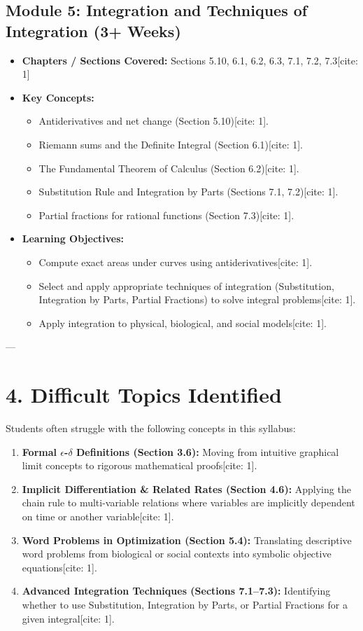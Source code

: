 \documentclass[11pt,a4paper]{article}
\begin{document}
\subsection*{Module 5: Integration and Techniques of Integration (3+ Weeks) \cite{1}}
\begin{itemize}
    \item \textbf{Chapters / Sections Covered:} Sections 5.10, 6.1, 6.2, 6.3, 7.1, 7.2, 7.3[cite: 1]
    \item \textbf{Key Concepts:}
    \begin{itemize}
        \item Antiderivatives and net change (Section 5.10)[cite: 1].
        \item Riemann sums and the Definite Integral (Section 6.1)[cite: 1].
        \item The Fundamental Theorem of Calculus (Section 6.2)[cite: 1].
        \item Substitution Rule and Integration by Parts (Sections 7.1, 7.2)[cite: 1].
        \item Partial fractions for rational functions (Section 7.3)[cite: 1].
    \end{itemize}
    \item \textbf{Learning Objectives:}
    \begin{itemize}
        \item Compute exact areas under curves using antiderivatives[cite: 1].
        \item Select and apply appropriate techniques of integration (Substitution, Integration by Parts, Partial Fractions) to solve integral problems[cite: 1].
        \item Apply integration to physical, biological, and social models[cite: 1].
    \end{itemize}
\end{itemize}

---

\section*{4. Difficult Topics Identified}
Students often struggle with the following concepts in this syllabus:
\begin{enumerate}
    \item \textbf{Formal $\epsilon$-$\delta$ Definitions (Section 3.6):} Moving from intuitive graphical limit concepts to rigorous mathematical proofs[cite: 1].
    \item \textbf{Implicit Differentiation \& Related Rates (Section 4.6):} Applying the chain rule to multi-variable relations where variables are implicitly dependent on time or another variable[cite: 1].
    \item \textbf{Word Problems in Optimization (Section 5.4):} Translating descriptive word problems from biological or social contexts into symbolic objective equations[cite: 1].
    \item \textbf{Advanced Integration Techniques (Sections 7.1--7.3):} Identifying whether to use Substitution, Integration by Parts, or Partial Fractions for a given integral[cite: 1].
\end{enumerate}
\end{document}
